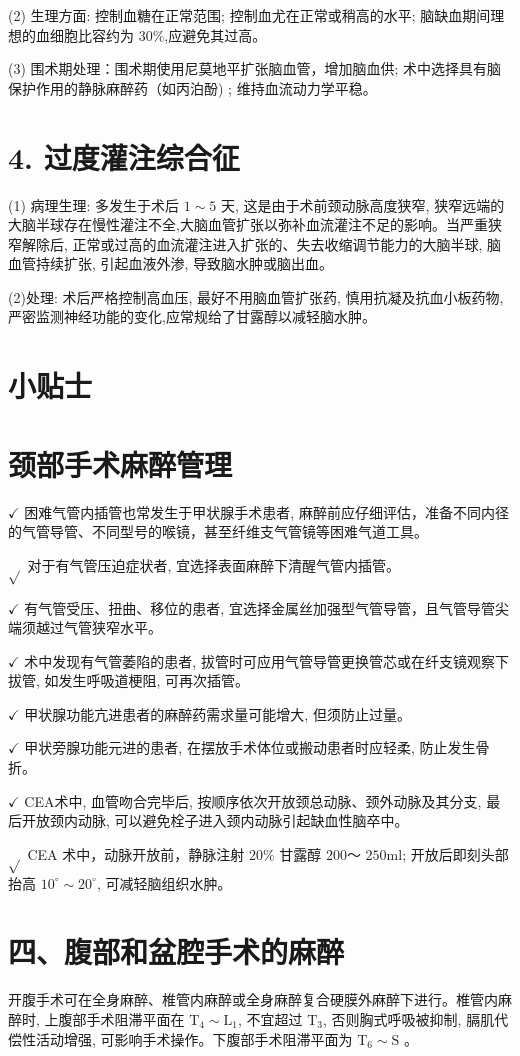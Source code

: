 \documentclass[10pt]{article}
\begin{document}
(2) 生理方面: 控制血糖在正常范围; 控制血尤在正常或稍高的水平; 脑缺血期间理想的血细胞比容约为 $30 \%$,应避免其过高。

(3) 围术期处理：围术期使用尼莫地平扩张脑血管，增加脑血供; 术中选择具有脑保护作用的静脉麻醉药（如丙泊酚) ; 维持血流动力学平稳。

\section*{4. 过度灌注综合征}
(1) 病理生理: 多发生于术后 $1 \sim 5$ 天, 这是由于术前颈动脉高度狭窄, 狭窄远端的大脑半球存在慢性灌注不全,大脑血管扩张以弥补血流灌注不足的影响。当严重狭窄解除后, 正常或过高的血流灌注进入扩张的、失去收缩调节能力的大脑半球, 脑血管持续扩张, 引起血液外渗, 导致脑水肿或脑出血。

(2)处理: 术后严格控制高血压, 最好不用脑血管扩张药, 慎用抗凝及抗血小板药物, 严密监测神经功能的变化,应常规给了甘露醇以减轻脑水肿。

\section*{小贴士}
\section*{颈部手术麻醉管理}
$\checkmark$ 困难气管内插管也常发生于甲状腺手术患者, 麻醉前应仔细评估，准备不同内径的气管导管、不同型号的喉镜，甚至纤维支气管镜等困难气道工具。

$\sqrt{ }$ 对于有气管压迫症状者, 宜选择表面麻醉下清醒气管内插管。

$\checkmark$ 有气管受压、扭曲、移位的患者, 宜选择金属丝加强型气管导管，且气管导管尖端须越过气管狭窄水平。

$\checkmark$ 术中发现有气管萎陷的患者, 拔管时可应用气管导管更换管芯或在纤支镜观察下拔管, 如发生呼吸道梗阻, 可再次插管。

$\checkmark$ 甲状腺功能亢进患者的麻醉药需求量可能增大, 但须防止过量。

$\checkmark$ 甲状旁腺功能元进的患者, 在摆放手术体位或搬动患者时应轻柔, 防止发生骨折。

$\checkmark$ CEA术中, 血管吻合完毕后, 按顺序依次开放颈总动脉、颈外动脉及其分支, 最后开放颈内动脉, 可以避免栓子进入颈内动脉引起缺血性脑卒中。

$\sqrt{ }$ CEA 术中，动脉开放前，静脉注射 $20 \%$ 甘露醇 $200 ～$ $250 \mathrm{ml}$; 开放后即刻头部抬高 $10^{\circ} \sim 20^{\circ}$, 可减轻脑组织水肿。

\section*{四、腹部和盆腔手术的麻醉}
开腹手术可在全身麻醉、椎管内麻醉或全身麻醉复合硬膜外麻醉下进行。椎管内麻醉时, 上腹部手术阻滞平面在 $\mathrm{T}_{4} \sim \mathrm{L}_{1}$, 不宜超过 $\mathrm{T}_{3}$, 否则胸式呼吸被抑制, 膈肌代偿性活动增强, 可影响手术操作。下腹部手术阻滞平面为 $\mathrm{T}_{6} \sim \mathrm{S}$ 。
\end{document}

